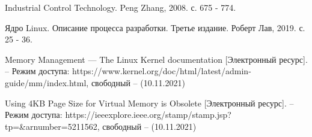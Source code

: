 \begin{thebibliography}{}
	Industrial Control Technology. Peng Zhang, 2008. с. 675 - 774.
	
	Ядро Linux. Описание процесса разработки. Третье издание. Роберт Лав, 2019. с. 25 - 36.
	
	
Memory Management — The Linux Kernel documentation [Электронный ресурс]. – Режим доступа: https://www.kernel.org/doc/html/latest/admin-guide/mm/index.html, свободный – (10.11.2021)
	
	
	
Using 4KB Page Size for Virtual Memory is Obsolete [Электронный ресурс]. – Режим доступа: https://ieeexplore.ieee.org/stamp/stamp.jsp?tp=\&arnumber=5211562, свободный – (10.11.2021)
	
\end{thebibliography}
\endgroup

\pagebreak